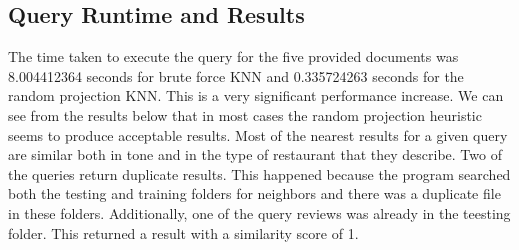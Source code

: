 \documentclass[paper=a4, fontsize=11pt]{jhwhw} %
\begin{document}
\subsection{Query Runtime and Results}
The time taken to execute the query for the five provided documents was 8.004412364 seconds for brute force KNN and 0.335724263 seconds for the random projection KNN. This is a very significant performance increase. We can see from the results below that in most cases the random projection heuristic seems to produce acceptable results. Most of the nearest results for a given query are similar both in tone and in the type of restaurant that they describe. Two of the queries return duplicate results. This happened because the program searched both the testing and training folders for neighbors and there was a duplicate file in these folders. Additionally, one of the query reviews was already in the teesting folder. This returned a result with a similarity score of 1. 
\end{document}
